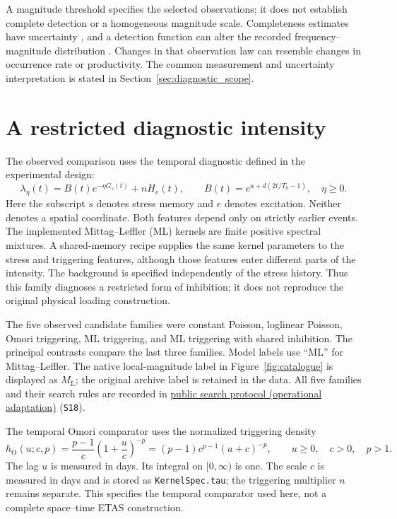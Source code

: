 A magnitude threshold specifies the selected observations; it does not establish
complete detection or a homogeneous magnitude scale. Completeness estimates
have uncertainty \citep{WoessnerWiemer2005}, and a detection function can alter
the recorded frequency--magnitude distribution \citep{Mignan2012}. Changes in
that observation law can resemble changes in occurrence rate or productivity.
The common measurement and uncertainty interpretation is stated in
Section~\ref{sec:diagnostic_scope}.

\section{A restricted diagnostic intensity}

The observed comparison uses the temporal diagnostic defined in the experimental design:
\begin{equation}
 \lambda_\eta(t)=B(t)e^{-\eta G_s(t)}+nH_e(t),\qquad
 B(t)=e^{a+d(2t/T_0-1)},\quad \eta\geq0.
 \label{eq:observed-diagnostic}
\end{equation}
Here the subscript \(s\) denotes stress memory and \(e\) denotes excitation. Neither denotes a spatial coordinate. Both features depend only on strictly earlier events. The implemented Mittag--Leffler (ML) kernels are finite positive spectral mixtures. A shared-memory recipe supplies the same kernel parameters to the stress and triggering features, although those features enter different parts of the intensity. The background is specified independently of the stress history. Thus this family diagnoses a restricted form of inhibition; it does not reproduce the original physical loading construction.

The five observed candidate families were constant Poisson, loglinear Poisson, Omori triggering, ML triggering, and ML triggering with shared inhibition. The principal contrasts compare the last three families. Model labels use ``ML'' for Mittag--Leffler. The native local-magnitude label in Figure~\ref{fig:catalogue} is displayed as \(M_{\mathrm L}\); the original archive label is retained in the data. All five families and their search rules are recorded in \href{https://github.com/Drefetr/An_Evaluation_of_Earthquake_Models/blob/61aa599cd023f2441a6a0c6af9aa4b6fe9eda3e5/engine/iteration_27/configs/observed_frozen.json}{public search protocol (operational adaptation)} (\texttt{S18}).

The temporal Omori comparator uses the normalized triggering density
\[
 h_{\mathrm O}(u;c,p)=\frac{p-1}{c}\left(1+\frac{u}{c}\right)^{-p}
 =(p-1)c^{p-1}(u+c)^{-p},
 \qquad u\geq0,\quad c>0,\quad p>1.
\]
The lag \(u\) is measured in days. Its integral on $[0,\infty)$ is one. The scale $c$ is measured in days and
is stored as \texttt{KernelSpec.tau}; the triggering multiplier $n$ remains
separate. This specifies the temporal comparator used here, not a complete
space--time ETAS construction.

